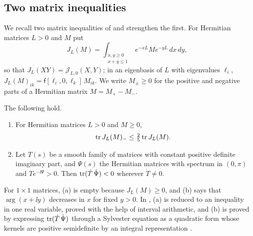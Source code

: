 \subsection{Two matrix inequalities}
We recall two matrix inequalities of \cite{wue26b} and strengthen the first. For Hermitian matrices $L>0$
and $M$ put
\[
 J_L(M)=\int_{\substack{x,y\geq0\\x+y\leq1}}e^{-xL}Me^{-yL}\,dx\,dy ,
\]
so that $J_L(XY)=\mathcal J_{L,0}(X,Y)$; in an eigenbasis of $L$ with
eigenvalues $\ell_i$, $J_L(M)_{ik}=\mathsf f[\ell_i,0,\ell_k]\,M_{ik}$. We
write $M_\pm\geq0$ for the positive and negative parts of a Hermitian matrix
$M=M_+-M_-$.

\begin{theorem}\label{thm:imported}
The following hold.
\begin{enumerate}
\item[(a)] For Hermitian matrices $L>0$ and $M\geq0$,
 \begin{equation}\label{eq:kernel}
 \operatorname{tr} J_L(M)_-\leq\tfrac25\operatorname{tr} J_L(M).
 \end{equation}
\item[(b)] Let $T(s)$ be a smooth family of matrices with constant positive
 definite imaginary part, and $\Psi(s)$ the Hermitian matrices with spectrum
 in $(0,\pi)$ and $T e^{-\ii\Psi}>0$. Then $\operatorname{tr}(\dot T\,\dot\Psi)<0$ wherever
 $\dot T\neq0$.
\end{enumerate}
\end{theorem}

For $1\times1$ matrices, (a) is empty because $J_L(M)\geq0$, and (b) says
that $\arg(x+\ii y)$ decreases in $x$ for fixed $y>0$. In \cite{wue26b}, (a)
is reduced to an inequality in one real variable, proved with the help of
interval arithmetic, and (b) is proved by expressing
$\operatorname{tr}(\dot T\,\dot\Psi)$ through a Sylvester equation as a quadratic form whose
kernels are positive semidefinite by an integral representation
\cite[Section~4]{wue26b}.

